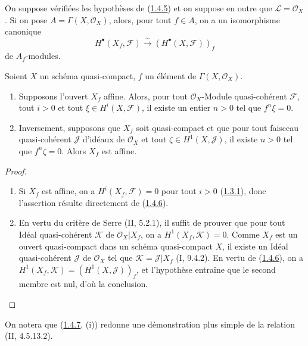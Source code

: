 \begin{corollary}[1.4.6]
\label{III.1.4.6-fr}
On suppose vérifiées les hypothèses de
(\hyperref[III.1.4.5-fr]{1.4.5}) et on suppose en outre que
$\mathcal L=\mathcal O_X$. Si on pose $A=\Gamma(X,\mathcal O_X)$, alors,
pour tout $f\in A$, on a un isomorphisme canonique
\[
H^\bullet(X_f,\mathcal F)
\xrightarrow{\sim}(H^\bullet(X,\mathcal F))_f
\]
de $A_f$-modules.
\end{corollary}

\begin{corollary}[1.4.7]
\label{III.1.4.7-fr}
Soient $X$ un schéma quasi-compact, $f$ un élément de
$\Gamma(X,\mathcal O_X)$.
\begin{enumerate}
\item[(i)] Supposons l'ouvert $X_f$ affine. Alors, pour tout
$\mathcal O_X$-Module quasi-cohérent $\mathcal F$, tout $i>0$ et tout
$\xi\in H^i(X,\mathcal F)$, il existe un entier $n>0$ tel que $f^n\xi=0$.
\item[(ii)] Inversement, supposons que $X_f$ soit quasi-compact et que pour
tout faisceau quasi-cohérent $\mathcal J$ d'idéaux de $\mathcal O_X$ et tout
$\zeta\in H^1(X,\mathcal J)$, il existe $n>0$ tel que $f^n\zeta=0$. Alors
$X_f$ est affine.
\end{enumerate}
\end{corollary}

\begin{proof}
\begin{enumerate}
\item[(i)] Si $X_f$ est affine, on a $H^i(X_f,\mathcal F)=0$ pour tout
$i>0$ (\hyperref[III.1.3.1-fr]{1.3.1}), donc l'assertion résulte directement
de (\hyperref[III.1.4.6-fr]{1.4.6}).
\item[(ii)] En vertu du critère de Serre (II, 5.2.1), il suffit de prouver
que pour tout Idéal quasi-cohérent $\mathcal K$ de
$\mathcal O_X\vert X_f$, on a $H^1(X_f,\mathcal K)=0$. Comme $X_f$ est un
ouvert quasi-compact dans un schéma quasi-compact $X$, il existe un Idéal
quasi-cohérent $\mathcal J$ de $\mathcal O_X$ tel que
$\mathcal K=\mathcal J\vert X_f$ (I, 9.4.2). En vertu de
(\hyperref[III.1.4.6-fr]{1.4.6}), on a
$H^1(X_f,\mathcal K)=(H^1(X,\mathcal J))_f$, et l'hypothèse entraîne que le
second membre est nul, d'où la conclusion.
\end{enumerate}
\end{proof}

\begin{remark}[1.4.8]
\label{III.1.4.8-fr}
On notera que (\hyperref[III.1.4.7-fr]{1.4.7}, (i)) redonne une
démonstration plus simple de la relation (II, 4.5.13.2).
\end{remark}

